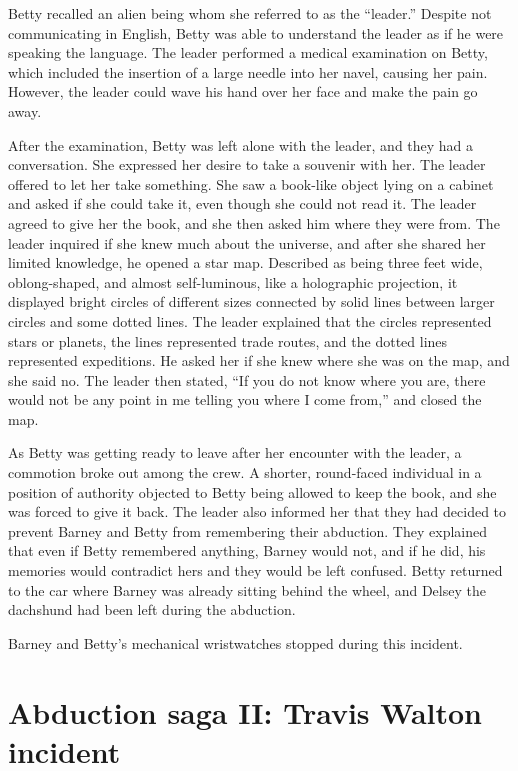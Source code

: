 Betty recalled an alien being whom she referred to as the ``leader.''
Despite not communicating in English, Betty was able to understand the leader as if he were speaking the language.
The leader performed a medical examination on Betty, which included the insertion of a large needle into her navel, causing her pain.
However, the leader could wave his hand over her face and make the pain go away.

After the examination, Betty was left alone with the leader, and they had a conversation.
She expressed her desire to take a souvenir with her.
 The leader offered to let her take something.
She saw a book-like object lying on a cabinet and asked if she could take it, even though she could not read it.
The leader agreed to give her the book, and she then asked him where they were from. The leader inquired if she knew much about the universe, and after she shared her limited knowledge, he opened a star map. Described as being three feet wide, oblong-shaped, and almost self-luminous, like a holographic projection, it displayed bright circles of different sizes connected by solid lines between larger circles and some dotted lines. The leader explained that the circles represented stars or planets, the lines represented trade routes, and the dotted lines represented expeditions. He asked her if she knew where she was on the map, and she said no. The leader then stated, ``If you do not know where you are, there would not be any point in me telling you where I come from,'' and closed the map.

As Betty was getting ready to leave after her encounter with the leader, a commotion broke out among the crew. A shorter, round-faced individual in a position of authority objected to Betty being allowed to keep the book, and she was forced to give it back. The leader also informed her that they had decided to prevent Barney and Betty from remembering their abduction. They explained that even if Betty remembered anything, Barney would not, and if he did, his memories would contradict hers and they would be left confused. Betty returned to the car where Barney was already sitting behind the wheel, and Delsey the dachshund had been left during the abduction.


Barney and Betty's mechanical wristwatches stopped during this incident.


\section{Abduction saga II: Travis Walton incident}
\label{2023-UFO-part-Perception-abductions-twui}

